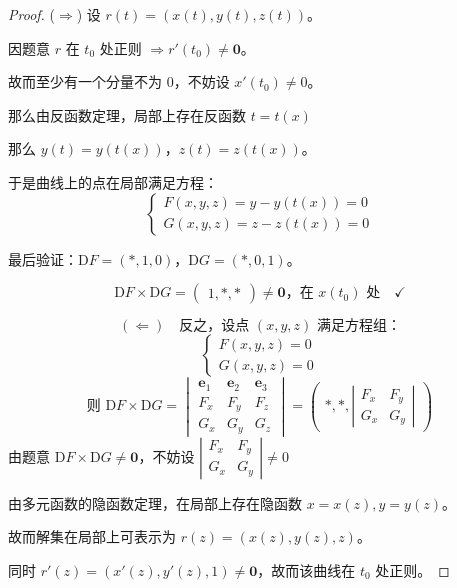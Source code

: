 \documentclass[lang=cn,10pt,thmcnt=section]{elegantbook}
\renewcommand{\vec}[1]{\mathbf{#1}}
\begin{document}
\begin{proof}
    ($\Rightarrow$) 设 $r(t) = (x(t), y(t), z(t))$。

因题意 $r$ 在 $t_0$ 处正则 $\Rightarrow r'(t_0) \neq \vec{0}$。

故而至少有一个分量不为 $0$，不妨设 $x'(t_0) \neq 0$。

那么由反函数定理，局部上存在反函数 $t = t(x)$

那么 $y(t) = y(t(x))$，$z(t) = z(t(x))$。

于是曲线上的点在局部满足方程：
\[
\begin{cases}
F(x, y, z) = y - y(t(x)) = 0 \\
G(x, y, z) = z - z(t(x)) = 0
\end{cases}
\]

最后验证：$\text{D}F = (*, 1, 0)$，$\text{D}G = (*, 0, 1)$。

\[
\text{D}F \times \text{D}G = \begin{pmatrix} 1, *, * \end{pmatrix} \neq \vec{0} \text{，在 } x(t_0) \text{ 处} \quad \checkmark
\]

\[
(\Leftarrow) \quad \text{反之，设点 } (x, y, z) \text{ 满足方程组：}
\]
\[
\begin{cases}
F(x, y, z) = 0 \\
G(x, y, z) = 0
\end{cases}
\]
\[
\text{则 } \text{D}F \times \text{D}G = \begin{vmatrix}
\mathbf{e}_1 & \mathbf{e}_2 & \mathbf{e}_3 \\
F_x & F_y & F_z \\
G_x & G_y & G_z
\end{vmatrix} = \begin{pmatrix} *, *, \left| \begin{matrix} F_x & F_y \\ G_x & G_y \end{matrix} \right| \end{pmatrix}
\]
由题意 $\text{D}F \times \text{D}G \neq \vec{0}$，不妨设 $\left| \begin{matrix} F_x & F_y \\ G_x & G_y \end{matrix} \right| \neq 0$

由多元函数的隐函数定理，在局部上存在隐函数 $x = x(z), y = y(z)$。
 
故而解集在局部上可表示为 $r(z) = (x(z), y(z), z)$。

同时 $r'(z) = (x'(z), y'(z), 1) \neq \vec{0}$，故而该曲线在 $t_0$ 处正则。
\end{proof}
\end{document}
